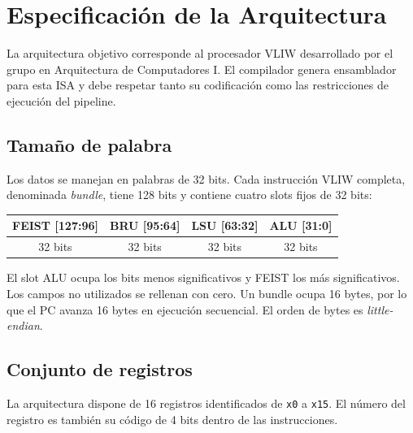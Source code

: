 \documentclass[11pt,letterpaper]{article}
\begin{document}
\tableofcontents
\clearpage

\setcounter{section}{2}
\section{Especificación de la Arquitectura}
\label{sec:arquitectura}

La arquitectura objetivo corresponde al procesador VLIW desarrollado por el grupo en Arquitectura de Computadores I. El compilador genera ensamblador para esta ISA y debe respetar tanto su codificación como las restricciones de ejecución del pipeline.

\subsection{Tamaño de palabra}

Los datos se manejan en palabras de 32 bits. Cada instrucción VLIW completa, denominada \textit{bundle}, tiene 128 bits y contiene cuatro slots fijos de 32 bits:

\begin{center}
\begin{tabular}{|c|c|c|c|}
\hline
\textbf{FEIST [127:96]} & \textbf{BRU [95:64]} & \textbf{LSU [63:32]} & \textbf{ALU [31:0]} \\
\hline
32 bits & 32 bits & 32 bits & 32 bits \\
\hline
\end{tabular}
\end{center}

El slot ALU ocupa los bits menos significativos y FEIST los más significativos. Los campos no utilizados se rellenan con cero. Un bundle ocupa 16 bytes, por lo que el PC avanza 16 bytes en ejecución secuencial. El orden de bytes es \textit{little-endian}.

\subsection{Conjunto de registros}

La arquitectura dispone de 16 registros identificados de \texttt{x0} a \texttt{x15}. El número del registro es también su código de 4 bits dentro de las instrucciones.
\end{document}
